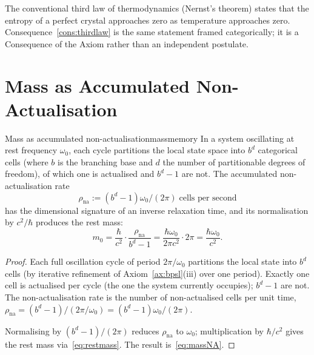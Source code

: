 \begin{remark}
The conventional third law of thermodynamics (Nernst's theorem) states that the entropy of a perfect crystal approaches zero as temperature approaches zero. Consequence~\ref{cons:thirdlaw} is the same statement framed categorically; it is a Consequence of the Axiom rather than an independent postulate.
\end{remark}

\section{Mass as Accumulated Non-Actualisation}
\label{sec:massmemory}

\begin{consequence}{Mass as accumulated non-actualisation}{massmemory}
In a system oscillating at rest frequency $\omega_{0}$, each cycle partitions the local state space into $b^{d}$ categorical cells (where $b$ is the branching base and $d$ the number of partitionable degrees of freedom), of which one is actualised and $b^{d}-1$ are not. The accumulated non-actualisation rate
\begin{equation}
\rho_{\text{na}}:=(b^{d}-1)\omega_{0}/(2\pi)\;\text{cells per second}
\label{eq:rateNA}
\end{equation}
has the dimensional signature of an inverse relaxation time, and its normalisation by $c^{2}/\hbar$ produces the rest mass:
\begin{equation}
m_{0}=\frac{\hbar}{c^{2}}\cdot\frac{\rho_{\text{na}}}{b^{d}-1}=\frac{\hbar\omega_{0}}{2\pi c^{2}}\cdot 2\pi=\frac{\hbar\omega_{0}}{c^{2}}.
\label{eq:massNA}
\end{equation}
\end{consequence}

\begin{proof}
Each full oscillation cycle of period $2\pi/\omega_{0}$ partitions the local state into $b^{d}$ cells (by iterative refinement of Axiom~\ref{ax:bpsl}(iii) over one period). Exactly one cell is actualised per cycle (the one the system currently occupies); $b^{d}-1$ are not. The non-actualisation rate is the number of non-actualised cells per unit time, $\rho_{\text{na}}=(b^{d}-1)/(2\pi/\omega_{0})=(b^{d}-1)\omega_{0}/(2\pi)$.

Normalising by $(b^{d}-1)/(2\pi)$ reduces $\rho_{\text{na}}$ to $\omega_{0}$; multiplication by $\hbar/c^{2}$ gives the rest mass via~\eqref{eq:restmass}. The result is~\eqref{eq:massNA}.
\end{proof}

